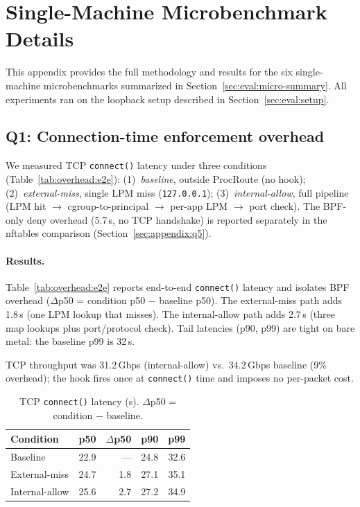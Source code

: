 \documentclass[sigconf]{acmart}
\begin{document}



\appendix

\section{Single-Machine Microbenchmark Details}
\label{sec:appendix:micro}

This appendix provides the full methodology and results for the
six single-machine microbenchmarks summarized in
Section~\ref{sec:eval:micro-summary}.
All experiments ran on the loopback setup described in
Section~\ref{sec:eval:setup}.

\subsection{Q1: Connection-time enforcement overhead}
\label{sec:appendix:q1}

We measured TCP \texttt{connect()} latency under three
conditions (Table~\ref{tab:overhead:e2e}):
(1)~\emph{baseline}, outside ProcRoute (no hook);
(2)~\emph{external-miss}, single LPM miss
(\texttt{127.0.0.1});
(3)~\emph{internal-allow}, full
pipeline (LPM hit $\to$ cgroup-to-principal $\to$
per-app LPM $\to$ port check).
The BPF-only deny overhead (5.7\,\textmu{}s, no TCP
handshake) is reported separately in the nftables
comparison (Section~\ref{sec:appendix:q5}).

\paragraph{Results.}
Table~\ref{tab:overhead:e2e} reports end-to-end
\texttt{connect()} latency and isolates BPF overhead
($\Delta$p50 = condition p50 $-$ baseline p50).
The external-miss path adds 1.8\,\textmu{}s (one LPM
lookup that misses).
The internal-allow path adds 2.7\,\textmu{}s (three map
lookups plus port/protocol check).
Tail latencies (p90, p99) are tight on bare metal: the baseline
p99 is 32\,\textmu{}s.

TCP throughput was 31.2\,Gbps (internal-allow) vs.\ 34.2\,Gbps
baseline (9\% overhead); the hook fires once at \texttt{connect()}
time and imposes no per-packet cost.

\begin{table}
\centering
\caption{TCP \texttt{connect()} latency (\textmu{}s).
  $\Delta$p50 = condition $-$ baseline.}
\label{tab:overhead:bpf}\label{tab:overhead:e2e}\label{tab:overhead}
\begin{tabular}{lrrrr}
\toprule
Condition & p50 & $\Delta$p50 & p90 & p99 \\
\midrule
Baseline       &  22.9 &   ---  &  24.8 &  32.6 \\
External-miss  &  24.7 &  1.8   &  27.1 &  35.1 \\
Internal-allow &  25.6 &  2.7   &  27.2 &  34.9 \\
\bottomrule
\end{tabular}
\end{table}
\end{document}
